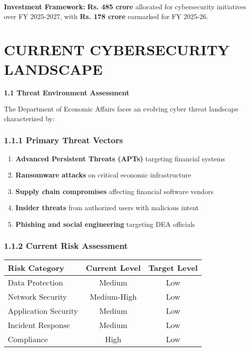 \documentclass[12pt,a4paper]{report}
\newcommand{\sectionheader}[1]{\textbf{\color{govblue}#1}}
\newcommand{\highlight}[1]{\textcolor{secorange}{\textbf{#1}}}
\begin{document}
\textbf{Investment Framework:} \textbf{Rs. 485 crore} allocated for cybersecurity initiatives over FY 2025-2027, with \textbf{Rs. 178 crore} earmarked for FY 2025-26.

\tableofcontents
\newpage

\chapter{CURRENT CYBERSECURITY LANDSCAPE}

\sectionheader{1.1 Threat Environment Assessment}

The Department of Economic Affairs faces an evolving cyber threat landscape characterized by:

\subsection*{1.1.1 Primary Threat Vectors}
\begin{enumerate}[leftmargin=*, itemsep=4pt]
    \item \highlight{Advanced Persistent Threats (APTs)} targeting financial systems
    \item \highlight{Ransomware attacks} on critical economic infrastructure
    \item \highlight{Supply chain compromises} affecting financial software vendors
    \item \highlight{Insider threats} from authorized users with malicious intent
    \item \highlight{Phishing and social engineering} targeting DEA officials
\end{enumerate}

\subsection*{1.1.2 Current Risk Assessment}
\begin{table}[h]
\centering
\begin{tabular}{@{}lcc@{}}
\toprule
\textbf{Risk Category} & \textbf{Current Level} & \textbf{Target Level} \\
\midrule
Data Protection & Medium & Low \\
Network Security & Medium-High & Low \\
Application Security & Medium & Low \\
Incident Response & Medium & Low \\
Compliance & High & Low \\
\bottomrule
\end{tabular}
\end{table}
\end{document}
